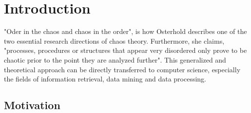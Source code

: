 \chapter{Introduction\label{cha:chapter1}}

"Oder in the chaos and chaos in the order", is how Osterhold \cite[p. 24 f.]{osterhold_2013} describes one of the two essential research directions of chaos theory. Furthermore, she claims, "processes, procedures or structures that appear very disordered only prove to be chaotic prior to the point they are analyzed further". This generalized and theoretical approach can be directly transferred to computer science, especially the fields of information retrieval, data mining and data processing. 

\section{Motivation\label{sec:moti}}

